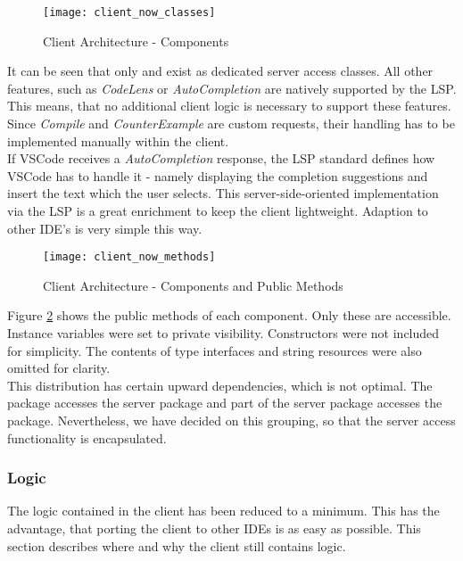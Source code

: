 \begin{figure}[H]
    \centering
    \texttt{[image: client\_now\_classes]}
    \caption{Client Architecture - Components}
    \label{fig:client_now_classes}
\end{figure}

It can be seen that only  and  exist as dedicated server access classes.
All other features, such as \textit{CodeLens} or \textit{AutoCompletion} are natively supported by the LSP.
This means, that no additional client logic is necessary to support these features.
Since \textit{Compile} and \textit{CounterExample} are custom requests,
their handling has to be implemented manually within the client.\\

If VSCode receives a \textit{AutoCompletion} response, the LSP standard defines how VSCode has to handle it -
namely displaying the completion suggestions and insert the text which the user selects.
This server-side-oriented implementation via the LSP is a great enrichment to keep the client lightweight.
Adaption to other IDE's is very simple this way.

\begin{figure}[H]
    \centering
    \texttt{[image: client\_now\_methods]}
    \caption{Client Architecture - Components and Public Methods}
    \label{fig:client_now_methods}
\end{figure}

Figure \ref{fig:client_now_methods} shows the public methods of each component.
Only these are accessible.
Instance variables were set to private visibility.
Constructors were not included for simplicity.
The contents of type interfaces and string resources were also omitted for clarity.\\

This distribution has certain upward dependencies, which is not optimal.
The  package accesses the server package and part of the server package accesses the  package.
Nevertheless, we have decided on this grouping,
so that the server access functionality is encapsulated.

\subsubsection{Logic}
The logic contained in the client has been reduced to a minimum.
This has the advantage, that porting the client to other IDEs is as easy as possible.
This section describes where and why the client still contains logic.\\

